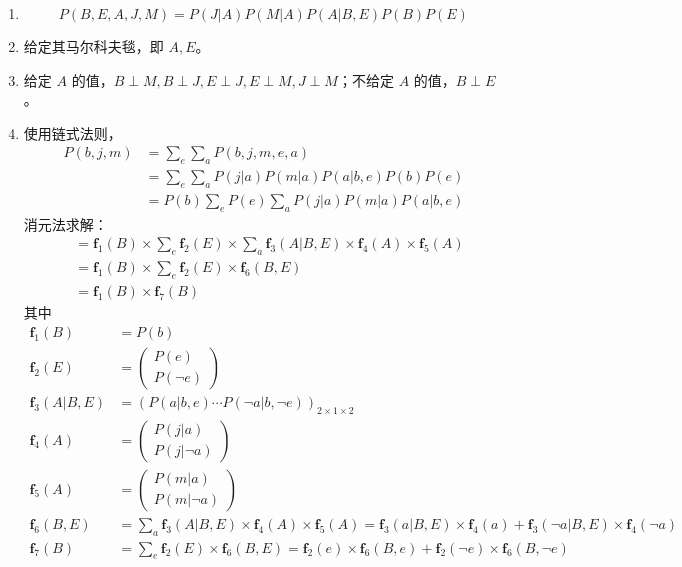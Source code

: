 \begin{solution}
    \begin{enumerate}
        \item \begin{equation*}
            P(B,E,A,J,M) = P(J|A)P(M|A)P(A|B,E)P(B)P(E)
        \end{equation*}
        \item 给定其马尔科夫毯，即 $A,E$。
        \item 给定 $A$ 的值，$B\perp M,B\perp J,E\perp J,E\perp M,J\perp M$；不给定 $A$ 的值，$B\perp E$。
        \item 使用链式法则，
        \begin{align*}
            P(b,j,m) &= \sum_{e}\sum_a P(b,j,m,e,a) \\
            &= \sum_{e}\sum_{a} P(j|a)P(m|a)P(a|b,e)P(b)P(e) \\
            &= P(b)\sum_{e}P(e)\sum_{a}P(j|a)P(m|a)P(a|b,e)
        \end{align*}
        消元法求解：
        \begin{align*}
            &= \mathbf{f}_1(B)\times\sum_e \mathbf{f}_2(E)\times\sum_a \mathbf{f}_3(A|B,E)\times\mathbf{f}_4(A)\times\mathbf{f}_5(A) \\
            &= \mathbf{f}_1(B)\times\sum_e \mathbf{f}_2(E)\times\mathbf{f}_6(B,E) \\
            &= \mathbf{f}_1(B)\times\mathbf{f}_7(B)
        \end{align*}
        其中
        \begin{align*}
            \mathbf{f}_1(B) &=P(b)\\
            \mathbf{f}_2(E) &=\begin{pmatrix}
                P(e)\\
                P(\neg e)
            \end{pmatrix}\\
            \mathbf{f}_3(A|B,E) &= (P(a|b,e)\cdots P(\neg a|b,\neg e))_{2\times 1 \times 2} \\
            \mathbf{f}_4(A) &= \begin{pmatrix}
                P(j|a)\\
                P(j|\neg a)
            \end{pmatrix}\\
            \mathbf{f}_5(A) &= \begin{pmatrix}
                P(m|a)\\
                P(m|\neg a)
            \end{pmatrix}\\
            \mathbf{f}_6(B,E) &= \sum_a \mathbf{f}_3(A|B,E)\times\mathbf{f}_4(A)\times\mathbf{f}_5(A) = \mathbf{f}_3(a|B,E)\times\mathbf{f}_4(a) + \mathbf{f}_3(\neg a|B,E)\times\mathbf{f}_4(\neg a) \\
            \mathbf{f}_7(B) &= \sum_e \mathbf{f}_2(E)\times \mathbf{f}_6 (B,E) = \mathbf{f}_2(e)\times \mathbf{f}_6 (B,e) + \mathbf{f}_2(\neg e)\times \mathbf{f}_6 (B,\neg e)  
        \end{align*}
    \end{enumerate}
\end{solution}

